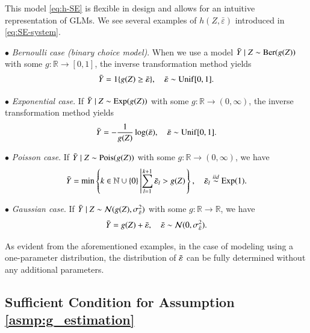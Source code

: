 \documentclass[12pt,reqno]{amsart}
\newcommand{\cbr}[1]{\left\{#1\right\}}
\newcommand{\N}{\mathbb{N}}
\newcommand{\R}{\mathbb{R}}
\begin{document}
This model \eqref{eq:h-SE} is flexible in design and allows for an intuitive representation of GLMs.
We see several examples of $h(Z,\bar{\varepsilon})$ introduced in \eqref{eq:SE-system}. 


\noindent $\bullet$ \textit{Bernoulli case (binary choice model)}. When we use a model $\Bar{Y}\mid Z\sim\mathrm{Ber}(g(Z))$ with some $g:\R\to[0,1]$, the inverse transformation method yields
\begin{align*}
    \bar{Y}=1\{g(Z)\ge\Bar{\varepsilon}\},\quad\Bar{\varepsilon}\sim\mathrm{Unif}[0,1].
\end{align*}

\noindent $\bullet$ \textit{Exponential case}. If $\Bar{Y}\mid Z\sim\mathrm{Exp}(g(Z))$ with some $g:\R\to(0,\infty)$, the inverse transformation method yields
\begin{align*}
    \Bar{Y}=-\frac{1}{g(Z)}\log(\Bar{\varepsilon}),\quad \Bar{\varepsilon}\sim\mathrm{Unif}[0,1].
\end{align*}

\noindent $\bullet$ \textit{Poisson case}. If $\Bar{Y}\mid Z\sim\mathrm{Pois}(g(Z))$ with some $g:\R\to(0,\infty)$, we have
\begin{align*}
    \Bar{Y}=\min\cbr{k\in\N\cup\{0\}\left|\sum_{l=1}^{k+1}\Bar{\varepsilon}_l> g(Z)\right.},\quad \bar{\varepsilon}_l\overset{\rm iid}{\sim}\mathrm{Exp}(1).
\end{align*}

\noindent $\bullet$ \textit{Gaussian case}. If $\Bar{Y}\mid Z\sim \mathcal{N}(g(Z),\sigma_{\Bar{\varepsilon}}^2)$ with some $g:\R\to\R$, we have
\begin{align*}
    \Bar{Y}=g(Z)+\Bar{\varepsilon},\quad \Bar{\varepsilon}\sim \mathcal{N}(0,\sigma_{\Bar{\varepsilon}}^2).
\end{align*}

As evident from the aforementioned examples, in the case of modeling using a one-parameter distribution, the distribution of $\Bar{\varepsilon}$ can be fully determined without any additional parameters.





\subsection{Sufficient Condition for Assumption \ref{asmp:g_estimation}} \label{sec:identification}
\end{document}
